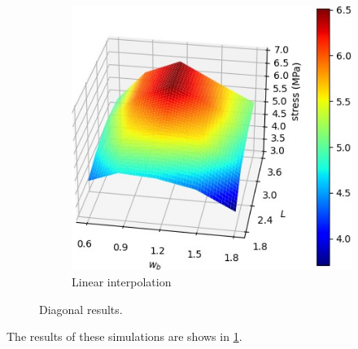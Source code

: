 \begin{figure}
	\centering
	\begin{subfigure}[B]{.49\columnwidth}
		\centering
		\includegraphics[width=\columnwidth]{sources/simulation/diagonal_sim_response.jpg}
		\caption{Linear interpolation}
	\end{subfigure}
	\caption{Diagonal results.}
	\label{fig:sim_diagonal_model}
\end{figure}


The results of these simulations are shows in \cref{fig:sim_diagonal_model}.









